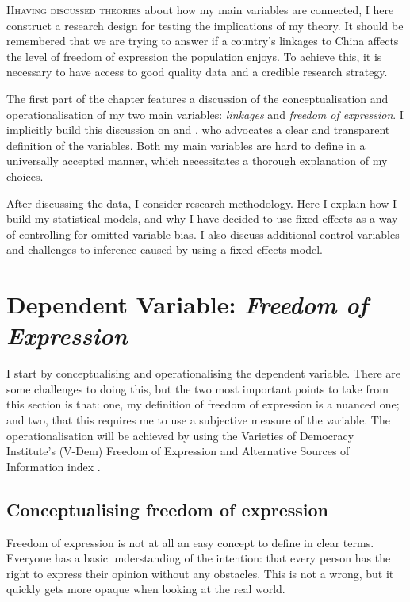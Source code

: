\lettrine{H}{having discussed theories} about how my main variables are connected, I here construct a research design for testing the implications of my theory. It should be remembered that we are trying to answer if a country's linkages to China affects the level of freedom of expression the population enjoys. To achieve this, it is necessary to have access to good quality data and a credible research strategy.

The first part of the chapter features a discussion of the conceptualisation and operationalisation of my two main variables: \textit{linkages} and \textit{freedom of expression}. I implicitly build this discussion on \citet{adcock_measurement_2001} and \citet{gerring_what_1999}, who advocates a clear and transparent definition of the variables. Both my main variables are hard to define in a universally accepted manner, which necessitates a thorough explanation of my choices. 

After discussing the data, I consider research methodology. Here I explain how I build my statistical models, and why I have decided to use fixed effects as a way of controlling for omitted variable bias. I also discuss additional control variables and challenges to inference caused by using a fixed effects model.

\section{Dependent Variable: \textit{Freedom of Expression}}
I start by conceptualising and operationalising the dependent variable. There are some challenges to doing this, but the two most important points to take from this section is that: one, my definition of freedom of expression is a nuanced one; and two, that this requires me to use a subjective measure of the variable. The operationalisation will be achieved by using the Varieties of Democracy Institute's (V-Dem) Freedom of Expression and Alternative Sources of Information index \citep{coppedge_v-dem_2025}. 

\subsection{Conceptualising freedom of expression}
Freedom of expression is not at all an easy concept to define in clear terms. Everyone has a basic understanding of the intention: that every person has the right to express their opinion without any obstacles. This is not a wrong, but it quickly gets more opaque when looking at the real world.

